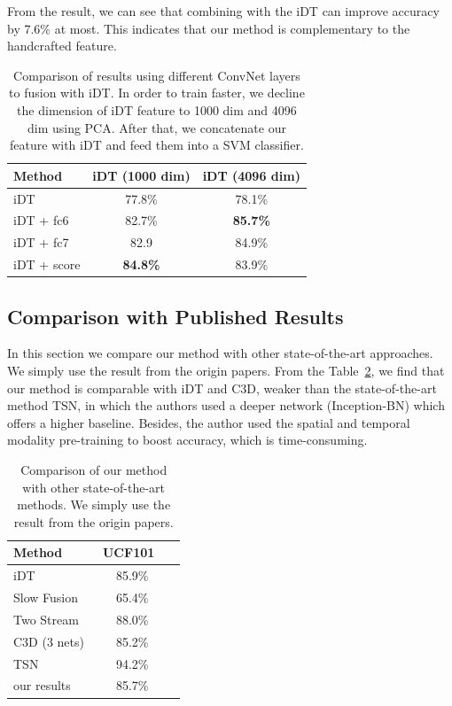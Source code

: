 \documentclass[10pt,twocolumn,letterpaper]{article}
\begin{document}
From the result, we can see that combining with the iDT can improve accuracy by 7.6\% at most. This indicates that our method is complementary to the handcrafted feature. 
\begin{table}
	\begin{center}
		\begin{tabular}{|l|c|c|}
			\hline
			Method 								& iDT (1000 dim) 			& iDT (4096 dim) 		\\
			\hline
			iDT 								& 77.8\% 				& 78.1\% 			\\
			iDT + fc6 							& 82.7\% 				& \textbf{85.7\%} 	\\
			iDT + fc7							& 82.9 					& 84.9\% 			\\
			iDT + score							& \textbf{84.8\%} 	& 83.9\% 			\\
			\hline																				
		\end{tabular}
	\end{center}
	\caption{Comparison of results using different ConvNet layers to fusion with iDT. In order to train faster, we decline the dimension of iDT feature to 1000 dim and 4096 dim using PCA. After that, we concatenate our feature with iDT and feed them into a SVM classifier.}
	\label{table:iDT}
\end{table}

\subsection{Comparison with Published Results}
In this section we compare our method with other state-of-the-art approaches. We simply use the result from the origin papers. From the Table~\ref{table:all_result}, we find that our method is comparable with iDT and C3D, weaker than the state-of-the-art method TSN, in which the authors used a deeper network (Inception-BN) which offers a higher baseline.  Besides, the author used the spatial and temporal modality pre-training to boost accuracy, which is time-consuming.  
\begin{table}
	\begin{center}
		\begin{tabular}{|l|c|c|}
			\hline
			Method &  UCF101~\cite{soomro2012ucf101} \\
			\hline
			iDT~\cite{wang2013action} 												& 85.9\% \\
			Slow Fusion~\cite{karpathy2014large}   								 		& 65.4\% \\
			Two Stream~\cite{simonyan2014two} 									 	& 88.0\% \\
			C3D (3 nets)~\cite{Tran_2015_ICCV}									  		& 85.2\% \\
			TSN~\cite{wang2016temporal}												& 94.2\% \\
			our results															 		& 85.7\% \\
			\hline
		\end{tabular}
	\end{center}
	\caption{Comparison of our method with other state-of-the-art methods. We simply use the result from the origin papers.}
	\label{table:all_result}
\end{table}
\end{document}
